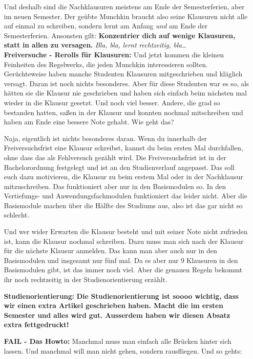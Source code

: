Und deshalb sind die Nachklausuren meistens am Ende der Semesterferien, aber im neuen Semester. Der
ge\"ubte Munchkin braucht also seine Klausuren nicht alle auf einmal zu
schreiben, sondern lernt am Anfang \emph{und} am Ende der Semesterferien.
Ansonsten gilt: \textbf{Konzentrier dich auf wenige Klausuren, statt in allen zu versagen.}
\emph{Bla, bla, lernt rechtzeitig, bla\dots}\\

\textbf{Freiversuche - Rerolls f\"ur Klausuren:}
Und jetzt kommen die kleinen Feinheiten des Regelwerks, die jeden Munchkin interessieren sollten.
Ger\"uchteweise haben manche Studenten Klausuren mitgeschrieben und kl\"aglich versagt. Daran ist noch nichts besonderes.
Aber f\"ur diese Studenten war es so, als h\"atten sie die Klausur nie
geschrieben und haben sich einfach beim n\"achsten mal wieder in die Klausur
gesetzt. Und noch viel besser. Andere, die grad so bestanden hatten, sa{\ss}en
in der Klausur und konnten nochmal mitschreiben und haben am Ende eine bessere
Note gehabt. Wie geht das?

Naja, eigentlich ist nichts besonderes daran. Wenn du innerhalb der
Freiversuchsfrist eine Klausur schreibst, kannst du beim ersten Mal
durchfallen, ohne dass das als Fehlversuch gez\"ahlt wird.
Die Freiversuchsfrist ist in der Bachelorordnung festgelegt und ist an den Studienverlauf angepasst.
Das soll euch dazu motivieren, die Klausur zu beim erstem Mal oder in der Nachklausur mitzuschreiben.
Das funktioniert aber nur in den Basismodulen so. In den Vertiefungs- und Anwendungsfachmodulen funktioniert das leider nicht.
Aber die Basismodule machen \"uber die H\"alfte des Studiums aus, also ist das gar nicht so schlecht.

Und wer wider Erwarten die Klausur besteht und mit seiner Note nicht zufrieden
ist, kann die Klausur nochmal schreiben. Dazu muss man sich nach der Klausur
f\"ur die n\"achste Klausur anmelden. Das kann man aber auch nur in den
Basismodulen und insgesamt nur f\"unf mal. Da es aber nur 9 Klausuren in den Basismodulen gibt,
ist das immer noch viel. Aber die genauen Regeln bekommt ihr noch rechtzeitig in der Studienorientierung erz\"ahlt.

\textbf{Studienorientierung:}
\textbf{
Die Studienorientierung ist soooo wichtig, dass wir einen extra Artikel geschrieben haben. Macht die im ersten Semester und alles wird gut. Ausserdem haben wir diesen Absatz extra fettgedruckt!}

\textbf{FAIL - Das Howto:}
Manchmal muss man einfach alle Br\"ucken hinter sich lassen. Und manchmal will man nicht gehen, sondern rausfliegen. Und so gehts:

